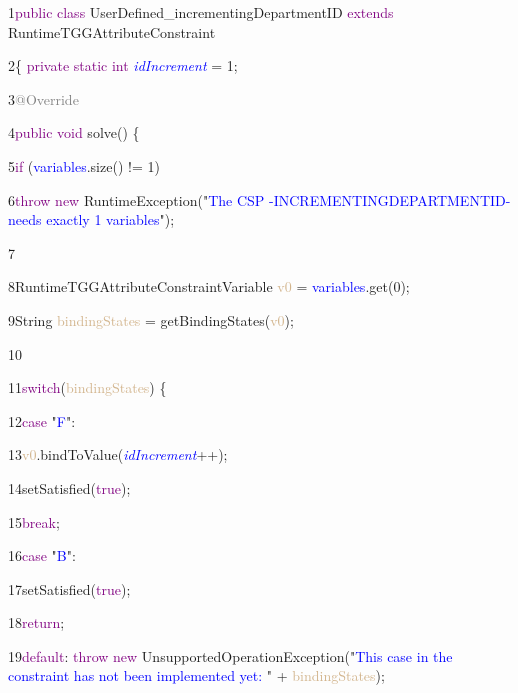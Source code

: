 {

1\hspace{0.5cm}\textcolor{Purple}{public class}
UserDefined\_incrementingDepartmentID \textcolor{Purple}{extends} RuntimeTGGAttributeConstraint

2\hspace{0.5cm}\{\hspace{0.5cm}	\textcolor{Purple}{private static int} \textcolor{Blue}{\textit{idIncrement}} = 1;

3\hspace{1cm}\textcolor{Grey}{@Override}

4\hspace{1cm}\textcolor{Purple}{public void} solve() \{

5\hspace{1.5cm}\textcolor{Purple}{if} (\textcolor{Blue}{variables}.size() != 1)

6\hspace{2cm}\textcolor{Purple}{throw new} RuntimeException("\textcolor{Blue}{The CSP -INCREMENTINGDEPARTMENTID- needs exactly 1 variables}");

7

8\hspace{1.5cm}RuntimeTGGAttributeConstraintVariable \textcolor{Tan}{v0} = \textcolor{Blue}{variables}.get(0);

9\hspace{1.5cm}String \textcolor{Tan}{bindingStates} = getBindingStates(\textcolor{Tan}{v0});

10

11\hspace{1.5cm}\textcolor{Purple}{switch}(\textcolor{Tan}{bindingStates}) \{

12\hspace{1.5cm}\textcolor{Purple}{case} "\textcolor{Blue}{F}":

13\hspace{2cm}\textcolor{Tan}{v0}.bindToValue(\textcolor{Blue}{\textit{idIncrement}}++);

14\hspace{2cm}setSatisfied(\textcolor{Purple}{true});

15\hspace{2cm}\textcolor{Purple}{break};

16\hspace{1.5cm}\textcolor{Purple}{case} "\textcolor{Blue}{B}":

17\hspace{2cm}setSatisfied(\textcolor{Purple}{true});

18\hspace{2cm}\textcolor{Purple}{return};

19\hspace{1.5cm}\textcolor{Purple}{default}: \textcolor{Purple}{throw new} UnsupportedOperationException("\textcolor{Blue}{This case in the constraint has not been implemented yet: }" + \textcolor{Tan}{bindingStates});

}

